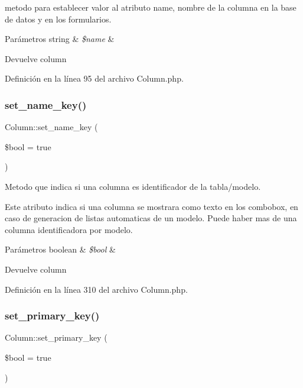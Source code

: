 metodo para establecer valor al atributo name, nombre de la columna en la base de datos y en los formularios.


\begin{DoxyParams}[1]{Parámetros}
string & {\em \$name} & \\
\hline
\end{DoxyParams}
\begin{DoxyReturn}{Devuelve}
column 
\end{DoxyReturn}


Definición en la línea 95 del archivo Column.\+php.

\mbox{\label{class_column_a8ecb11e158dea1d54dd042c593e96f0e}} 
\subsubsection{\texorpdfstring{set\_name\_key()}{set\_name\_key()}}
{\footnotesize\ttfamily Column\+::set\+\_\+name\+\_\+key (\begin{DoxyParamCaption}\item[{}]{\$bool = {\ttfamily true} }\end{DoxyParamCaption})}

Metodo que indica si una columna es identificador de la tabla/modelo.

Este atributo indica si una columna se mostrara como texto en los combobox, en caso de generacion de listas automaticas de un modelo. Puede haber mas de una columna identificadora por modelo.


\begin{DoxyParams}[1]{Parámetros}
boolean & {\em \$bool} & \\
\hline
\end{DoxyParams}
\begin{DoxyReturn}{Devuelve}
column 
\end{DoxyReturn}


Definición en la línea 310 del archivo Column.\+php.

\mbox{\label{class_column_a58d41e83c8ef7f3a021e1070f2e98cd3}} 
\subsubsection{\texorpdfstring{set\_primary\_key()}{set\_primary\_key()}}
{\footnotesize\ttfamily Column\+::set\+\_\+primary\+\_\+key (\begin{DoxyParamCaption}\item[{}]{\$bool = {\ttfamily true} }\end{DoxyParamCaption})}

